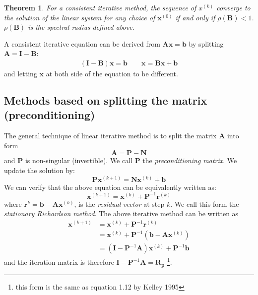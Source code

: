 \documentclass{article}
\newtheorem*{theorem}{Theorem}
\begin{document}
\begin{theorem}
    For a consistent iterative method, the sequence of $x^{(k)}$ converge to the solution 
    of the linear system for any choice of $\mathbf{x}^{(0)}$ if and only if 
    $\rho(\mathbf{B}) < 1$. $\rho(\mathbf{B})$ is the spectral radius defined above.
\end{theorem}

A consistent iterative equation can be derived from $\mathbf{A}\mathbf{x} = \mathbf{b}$ by 
splitting $\mathbf{A} = \mathbf{I} - \mathbf{B}$:
\begin{gather*}
    (\mathbf{I} - \mathbf{B}) \mathbf{x} = \mathbf{b} \qquad \mathbf{x} = \mathbf{B} \mathbf{x} + \mathbf{b}
\end{gather*}
and letting $\mathbf{x}$ at both side of the equation to be different.

\subsection{Methods based on splitting the matrix (preconditioning)}
The general technique of linear iterative method is to split the matrix $\mathbf{A}$
into form 
\begin{equation}
    \mathbf{A} = \mathbf{P} - \mathbf{N}
\end{equation}
and $\mathbf{P}$ is non-singular (invertible). We call $\mathbf{P}$ the 
\emph{preconditioning matrix}. We update the solution by:
\begin{equation*}
    \mathbf{P}\mathbf{x}^{(k+1)} = \mathbf{N}\mathbf{x}^{(k)} + \mathbf{b}  
\end{equation*}
We can verify that the above equation can be equivalently written as:
\begin{equation}
    \mathbf{x}^{(k+1)} = \mathbf{x}^{(k)} + \mathbf{P}^{-1}\mathbf{r}^{(k)}
\end{equation}
where $\mathbf{r}^{k} = \mathbf{b} - \mathbf{A}\mathbf{x}^{(k)}$, is 
the \emph{residual vector} at step $k$.
We call this form the \emph{stationary Richardson method}.
The above iterative method can be written as 
\begin{align*}
    \mathbf{x}^{(k+1)} &= \mathbf{x}^{(k)} + \mathbf{P}^{-1}\mathbf{r}^{(k)} \\
    &= \mathbf{x}^{(k)} + \mathbf{P}^{-1} \left(\mathbf{b} - \mathbf{A}\mathbf{x}^{(k)} \right) \\
    &= \left( \mathbf{I} - \mathbf{P}^{-1}\mathbf{A}  \right) \mathbf{x}^{(k)} + \mathbf{P}^{-1} \mathbf{b} 
\end{align*}
and the iteration matrix is therefore $\mathbf{I} - \mathbf{P}^{-1}\mathbf{A} = \mathbf{R_p}$
\footnote{this form is the same as equation 1.12 by Kelley 1995}.
\end{document}
